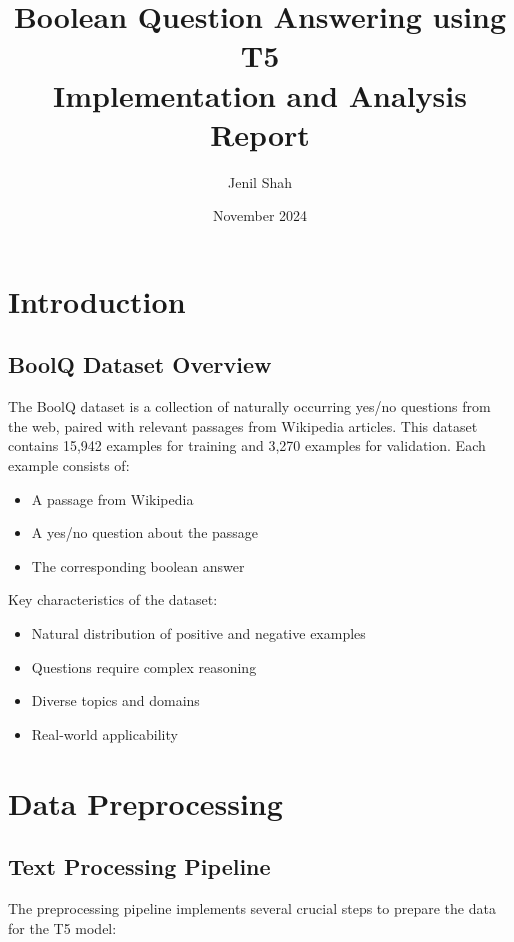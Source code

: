 \documentclass[12pt,a4paper]{report}
\title{\Huge\textbf{Boolean Question Answering using T5}\\\Large Implementation and Analysis Report}
\author{\Large Jenil Shah}
\date{\Large November 2024}
\begin{document}
\maketitle
\thispagestyle{empty}

\newpage
\tableofcontents
\thispagestyle{empty}

\newpage
\chapter{Introduction}
\section{BoolQ Dataset Overview}
The BoolQ dataset is a collection of naturally occurring yes/no questions from the web, paired with relevant passages from Wikipedia articles. This dataset contains 15,942 examples for training and 3,270 examples for validation. Each example consists of:

\begin{itemize}
    \item A passage from Wikipedia
    \item A yes/no question about the passage
    \item The corresponding boolean answer
\end{itemize}

Key characteristics of the dataset:
\begin{itemize}
    \item Natural distribution of positive and negative examples
    \item Questions require complex reasoning
    \item Diverse topics and domains
    \item Real-world applicability
\end{itemize}

\chapter{Data Preprocessing}
\section{Text Processing Pipeline}
The preprocessing pipeline implements several crucial steps to prepare the data for the T5 model:
\end{document}
